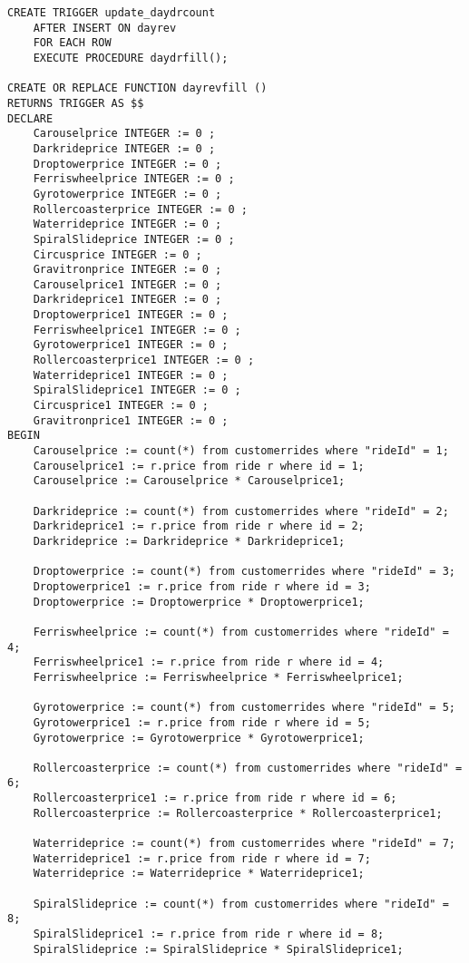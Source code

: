 \begin{lstlisting}
CREATE TRIGGER update_daydrcount
    AFTER INSERT ON dayrev
    FOR EACH ROW
    EXECUTE PROCEDURE daydrfill();

CREATE OR REPLACE FUNCTION dayrevfill ()
RETURNS TRIGGER AS $$
DECLARE
    Carouselprice INTEGER := 0 ;
    Darkrideprice INTEGER := 0 ;
    Droptowerprice INTEGER := 0 ;
    Ferriswheelprice INTEGER := 0 ;
    Gyrotowerprice INTEGER := 0 ;
    Rollercoasterprice INTEGER := 0 ;
    Waterrideprice INTEGER := 0 ;
    SpiralSlideprice INTEGER := 0 ;
    Circusprice INTEGER := 0 ;
    Gravitronprice INTEGER := 0 ;
    Carouselprice1 INTEGER := 0 ;
    Darkrideprice1 INTEGER := 0 ;
    Droptowerprice1 INTEGER := 0 ;
    Ferriswheelprice1 INTEGER := 0 ;
    Gyrotowerprice1 INTEGER := 0 ;
    Rollercoasterprice1 INTEGER := 0 ;
    Waterrideprice1 INTEGER := 0 ;
    SpiralSlideprice1 INTEGER := 0 ;
    Circusprice1 INTEGER := 0 ;
    Gravitronprice1 INTEGER := 0 ;
BEGIN
    Carouselprice := count(*) from customerrides where "rideId" = 1;
    Carouselprice1 := r.price from ride r where id = 1;
    Carouselprice := Carouselprice * Carouselprice1;

    Darkrideprice := count(*) from customerrides where "rideId" = 2;
    Darkrideprice1 := r.price from ride r where id = 2;
    Darkrideprice := Darkrideprice * Darkrideprice1;

    Droptowerprice := count(*) from customerrides where "rideId" = 3;
    Droptowerprice1 := r.price from ride r where id = 3;
    Droptowerprice := Droptowerprice * Droptowerprice1;

    Ferriswheelprice := count(*) from customerrides where "rideId" = 4;
    Ferriswheelprice1 := r.price from ride r where id = 4;
    Ferriswheelprice := Ferriswheelprice * Ferriswheelprice1;

    Gyrotowerprice := count(*) from customerrides where "rideId" = 5;
    Gyrotowerprice1 := r.price from ride r where id = 5;
    Gyrotowerprice := Gyrotowerprice * Gyrotowerprice1;

    Rollercoasterprice := count(*) from customerrides where "rideId" = 6;
    Rollercoasterprice1 := r.price from ride r where id = 6;
    Rollercoasterprice := Rollercoasterprice * Rollercoasterprice1;

    Waterrideprice := count(*) from customerrides where "rideId" = 7;
    Waterrideprice1 := r.price from ride r where id = 7;
    Waterrideprice := Waterrideprice * Waterrideprice1;

    SpiralSlideprice := count(*) from customerrides where "rideId" = 8;
    SpiralSlideprice1 := r.price from ride r where id = 8;
    SpiralSlideprice := SpiralSlideprice * SpiralSlideprice1;


\end{lstlisting}
